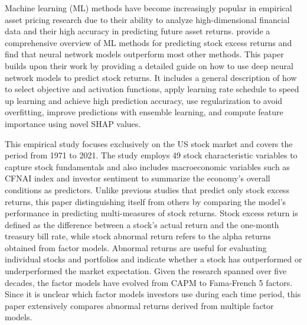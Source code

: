 Machine learning (ML) methods have become increasingly popular in empirical asset pricing research due to their ability to analyze high-dimensional financial data and their high accuracy in predicting future asset returns. \citet*{gu2020empirical} provide a comprehensive overview of ML methods for predicting stock excess returns and find that neural network models outperform most other methods. This paper builds upon their work by providing a detailed guide on how to use deep neural network models to predict stock returns. It includes a general description of how to select objective and activation functions, apply learning rate schedule to speed up learning and achieve high prediction accuracy, use regularization to avoid overfitting, improve predictions with ensemble learning, and compute feature importance using novel SHAP values.

This empirical study focuses exclusively on the US stock market and covers the period from 1971 to 2021. The study employs 49 stock characteristic variables to capture stock fundamentals and also  includes macroeconomic variables such as CFNAI index and investor sentiment to summarize the economy's overall conditions as predictors. Unlike previous studies that predict only stock excess returns, this paper distinguishing itself from others by comparing the model's performance in predicting multi-measures of stock returns. Stock excess return is defined as the difference between a stock's actual return and the one-month treasury bill rate, while stock abnormal return refers to the alpha returns obtained from factor models. Abnormal returns are useful for evaluating individual stocks and portfolios and indicate whether a stock has outperformed or underperformed the market expectation. Given the research spanned over five decades, the factor models have evolved from CAPM to Fama-French 5 factors. Since it is unclear which factor models investors use during each time period, this paper extensively compares abnormal returns derived from multiple factor models.

